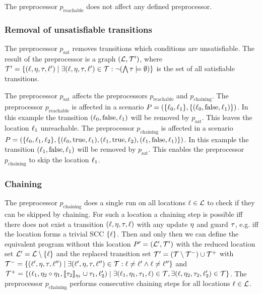 The preprocessor $p_{\text{reachable}}$ does not affect any defined preprocessor.

\subsubsection{Removal of unsatisfiable transitions}

The preprocessor $p_{\text{sat}}$ removes transitions which conditions are unsatisfiable.
The result of the preprocessor is a graph $(\mathcal{L}, \mathcal{T}')$, where $\mathcal{T}' = \lbrace (\ell,\eta,\tau,\ell') \mid \exists (\ell,\eta,\tau,\ell') \in \mathcal{T}: \neg (\bigwedge \tau \models \emptyset) \rbrace$ is the set of all satisfiable transitions.

The preprocessor $p_{\text{sat}}$ affects the preprocessors $p_{\text{reachable}}$ and $p_{\text{chaining}}$.
The preprocessor $p_{\text{reachable}}$ is affected in a scenario $P = (\lbrace \ell_0, \ell_1 \rbrace, \lbrace (\ell_0,\text{false},\ell_1) \rbrace)$.
In this example the transition $(\ell_0,\text{false},\ell_1)$ will be removed by $p_{\text{sat}}$.
This leaves the location $\ell_1$ unreachable.
The preprocessor $p_{\text{chaining}}$ is affected in a scenario $P = (\lbrace \ell_0, \ell_1, \ell_2 \rbrace, \lbrace (\ell_0,\text{true},\ell_1), (\ell_1,\text{true},\ell_2), (\ell_1,\text{false},\ell_1) \rbrace)$.
In this example the transition $(\ell_1,\text{false},\ell_1)$ will be removed by $p_{\text{sat}}$.
This enables the preprocessor $p_{\text{chaining}}$ to skip the location $\ell_1$.

\subsubsection{Chaining}

The preprocessor $p_{\text{chaining}}$ does a single run on all locations $\ell \in \mathcal{L}$ to check if they can be skipped by chaining.
For such a location a chaining step is possible iff there does not exist a transition $(\ell,\eta,\tau,\ell)$ with any update $\eta$ and guard $\tau$, e.g. iff the location forms a trivial SCC $\lbrace \ell \rbrace$.
Then and only then we can define the equivalent program without this location $P' = (\mathcal{L}', \mathcal{T}')$ with the reduced location set $\mathcal{L}' = \mathcal{L} \setminus \lbrace \ell \rbrace$ and the replaced transition set $\mathcal{T}' = (\mathcal{T} \setminus \mathcal{T}^-) \cup \mathcal{T}^+$ with $\mathcal{T}^- = \lbrace (\ell',\eta,\tau,\ell'') \mid \exists (\ell',\eta,\tau,\ell'') \in \mathcal{T}: \ell \neq \ell' \wedge \ell \neq \ell'' \rbrace$ and $\mathcal{T}^+ = \lbrace (\ell_1,\eta_2 \circ \eta_1,\llbracket \tau_2 \rrbracket_{\eta_1} \cup \tau_1,\ell_2') \mid \exists (\ell_1,\eta_1,\tau_1,\ell) \in \mathcal{T}, \exists (\ell,\eta_2,\tau_2,\ell_2') \in \mathcal{T} \rbrace$. 
The preprocessor $p_{\text{chaining}}$ performs consecutive chaining steps for all locations $\ell \in \mathcal{L}$.

